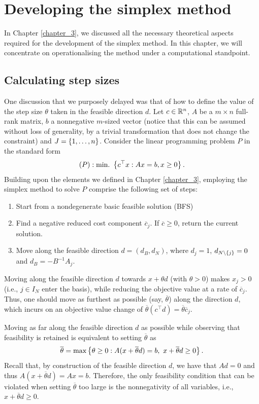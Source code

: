 \section{Developing the simplex method}

In Chapter \ref{chapter_3}, we discussed all the necessary theoretical aspects required for the development of the simplex method. In this chapter, we will concentrate on operationalising the method under a computational standpoint.

\subsection{Calculating step sizes}

One discussion that we purposely delayed was that of how to define the value of the step size $\theta$ taken in the feasible direction $d$. Let $c \in \mathbb{R}^n$, $A$ be a $m \times n$ full-rank matrix, $b$ a nonnegative $m$-sized vector (notice that this can be assumed without loss of generality, by a trivial transformation that does not change the constraint) and $J = \left\{ 1,\dots,n \right \}$. Consider the linear programming problem $P$ in the standard form 
%
	\begin{equation*}
		(P) : \mathop{\text{min.~}}\left\{ c^\top x : Ax = b, x \geq 0 \right \}.
	\end{equation*}
%
Building upon the elements we defined in Chapter \ref{chapter_3}, employing the simplex method to solve $P$ comprise the following set of steps:
%
\begin{enumerate}
	\item Start from a nondegenerate basic feasible solution (BFS)
	\item Find a negative reduced cost component $\overline{c}_j$. If $\overline{c} \geq 0$, return the current solution. 
	\item Move along the feasible direction $d = (d_B, d_N)$, where $d_j = 1$, $d_{N \setminus \left\{ j \right \}} = 0$ and $d_B = -B^{-1}A_j$.
\end{enumerate}
%
Moving along the feasible direction $d$ towards $x + \theta d$ (with $\theta > 0$) makes $x_j >0$ (i.e., $j \in I_N$ enter the basis), while reducing the objective value at a rate of $\overline{c}_j$. Thus, one should move as furthest as possible (say, $\overline{\theta}$) along the direction $d$, which incurs on an objective value change of $\overline{\theta} (c^\top d) = \overline{\theta} \overline{c}_j$.

Moving as far along the feasible direction $d$ as possible while observing that feasibility is retained is equivalent to setting $\overline{\theta}$ as 	
%
\begin{equation*}
	\overline{\theta} = \max\left\{ \theta \geq 0 : A(x + \overline{\theta} d) = b, \ x + \overline{\theta}d \geq 0 \right \}.	
\end{equation*}
%
Recall that, by construction of the feasible direction $d$, we have that $Ad = 0$ and thus $A(x + \overline{\theta} d) = Ax = b$. Therefore, the only feasibility condition that can be violated when setting $\overline{\theta}$ too large is the nonnegativity of all variables, i.e., $x + \overline{\theta}d \geq 0$. 

